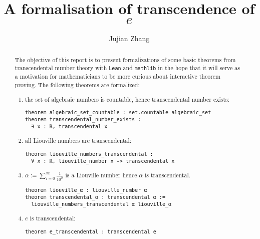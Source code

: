 \documentclass{report}
\title{A formalisation of transcendence of $e$}
\author{Jujian Zhang}
\theoremstyle{definition}
\theoremstyle{plain}
\begin{document}
\maketitle

\begin{abstract}
The objective of this report is to present formalizations of some basic theorems from transcendental number theory with {\tt Lean} and {\tt mathlib} in the hope that it will serve as a motivation for mathematicians to be more curious about interactive theorem proving. The following theorems are formalized:
\begin{enumerate}
  \item the set of algebraic numbers is countable, hence transcendental number exists:

\begin{verbatim}
theorem algebraic_set_countable : set.countable algebraic_set
theorem transcendental_number_exists : 
  ∃ x : ℝ, transcendental x
\end{verbatim}

  \item all Liouville numbers are transcendental:
\begin{verbatim}
theorem liouville_numbers_transcendental : 
  ∀ x : ℝ, liouville_number x -> transcendental x
\end{verbatim}

  \item $\alpha := \sum_{i=0}^\infty\frac1{10^{i!}}$ is a Liouville number hence $\alpha$ is transcendental.

\begin{verbatim}
theorem liouville_α : liouville_number α
theorem transcendental_α : transcendental α := 
  liouville_numbers_transcendental α liouville_α
\end{verbatim}

  \item $e$ is transcendental:
\begin{verbatim}
theorem e_transcendental : transcendental e
\end{verbatim}
\end{enumerate}
\end{abstract}
\end{document}
